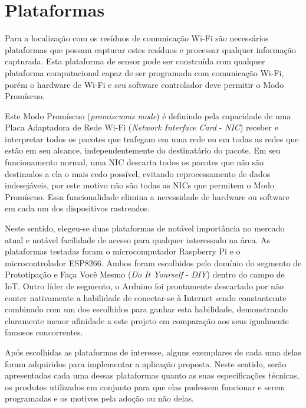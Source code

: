 \chapter{Plataformas}
\label{chap:Plataformas}

Para a localização com os resíduos de comunicação Wi-Fi são necessários
plataformas que possam capturar estes resíduos e processar qualquer informação
capturada. Esta plataforma de sensor pode ser construída com
qualquer plataforma computacional capaz de ser programada com comunicação
Wi-Fi, porém o hardware de Wi-Fi e seu software
controlador deve permitir o Modo Promíscuo.

Este Modo Promíscuo (\emph{promiscuous mode}) é definindo pela capacidade de uma
Placa Adaptadora de Rede Wi-Fi (\emph{Network Interface Card} -
\emph{NIC}) receber e interpretar todos os pacotes que trafegam em uma rede ou
em todas as redes que estão em seu alcance, independentemente do destinatário do
pacote. Em seu funcionamento normal, uma NIC descarta todos os pacotes que
não são destinados a ela o mais cedo possível, evitando reprocessamento de
dados indesejáveis, por este motivo não são todas as NICs que permitem o
Modo Promíscuo. Essa funcionalidade elimina a necessidade de hardware ou
software em cada um dos dispositivos rastreados.

Neste sentido, elegeu-se duas plataformas de notável importância no mercado atual
e notável facilidade de acesso para qualquer interessado na área. As plataformas
testadas foram o microcomputador Raspberry Pi e o microcontrolador
ESP8266. Ambos  foram escolhidos pelo domínio do segmento de Prototipação
e Faça Você Mesmo  (\emph{Do It Yourself} - \emph{DIY}) dentro do campo de IoT.
Outro líder de segmento, o Arduino foi prontamente descartado por não
conter nativamente a habilidade de conectar-se à Internet sendo
constantemte combinado com um dos escolhidos para ganhar esta habilidade,
demonstrando claramente menor afinidade a este projeto em comparação aos seus
igualmente famosos concorrentes.

Após escolhidas as plataformas de interesse, alguns exemplares de cada uma delas
foram adquiridos para implementar a aplicação proposta. Neste sentido, serão
apresentadas cada uma dessas plataformas quanto as suas especificações técnicas,
os produtos utilizados em conjunto para que elas pudessem funcionar e serem
programadas e os motivos pela adoção ou não delas.
